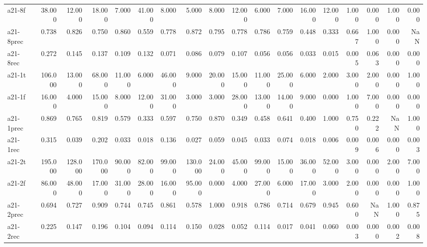 \begin{tabular}{lrrrrrrrrrrrrrrrrr}
a21-8f     &   38.000 &   12.000 &   18.000 &      7.000 &  41.000 &    8.000 &       5.000 &    8.000 &          12.000 &       6.000 &    7.000 &      16.000 &      12.000 &    1.000 &   0.000 &   1.000 &   0.000 \\
a21-8prec  &    0.738 &    0.826 &    0.750 &      0.860 &   0.559 &    0.778 &       0.872 &    0.795 &           0.778 &       0.786 &    0.759 &       0.448 &       0.333 &    0.667 &   1.000 &   0.000 &     NaN \\
a21-8rec   &    0.272 &    0.145 &    0.137 &      0.109 &   0.132 &    0.071 &       0.086 &    0.079 &           0.107 &       0.056 &    0.056 &       0.033 &       0.015 &    0.005 &   0.063 &   0.000 &   0.000 \\
a21-1t     &  106.000 &   13.000 &   68.000 &     11.000 &   6.000 &   46.000 &       9.000 &   20.000 &          15.000 &      11.000 &   25.000 &       6.000 &       2.000 &    3.000 &   2.000 &   0.000 &   1.000 \\
a21-1f     &   16.000 &    4.000 &   15.000 &      8.000 &  12.000 &   31.000 &       3.000 &    3.000 &          28.000 &      13.000 &   14.000 &       9.000 &       0.000 &    1.000 &   7.000 &   0.000 &   0.000 \\
a21-1prec  &    0.869 &    0.765 &    0.819 &      0.579 &   0.333 &    0.597 &       0.750 &    0.870 &           0.349 &       0.458 &    0.641 &       0.400 &       1.000 &    0.750 &   0.222 &     NaN &   1.000 \\
a21-1rec   &    0.315 &    0.039 &    0.202 &      0.033 &   0.018 &    0.136 &       0.027 &    0.059 &           0.045 &       0.033 &    0.074 &       0.018 &       0.006 &    0.009 &   0.006 &   0.000 &   0.003 \\
a21-2t     &  195.000 &  128.000 &  170.000 &     90.000 &  82.000 &   99.000 &     130.000 &   24.000 &          45.000 &      99.000 &   15.000 &      36.000 &      52.000 &    3.000 &   0.000 &   2.000 &   7.000 \\
a21-2f     &   86.000 &   48.000 &   17.000 &     31.000 &  28.000 &   16.000 &      95.000 &    0.000 &           4.000 &      27.000 &    6.000 &      17.000 &       3.000 &    2.000 &   0.000 &   0.000 &   1.000 \\
a21-2prec  &    0.694 &    0.727 &    0.909 &      0.744 &   0.745 &    0.861 &       0.578 &    1.000 &           0.918 &       0.786 &    0.714 &       0.679 &       0.945 &    0.600 &     NaN &   1.000 &   0.875 \\
a21-2rec   &    0.225 &    0.147 &    0.196 &      0.104 &   0.094 &    0.114 &       0.150 &    0.028 &           0.052 &       0.114 &    0.017 &       0.041 &       0.060 &    0.003 &   0.000 &   0.002 &   0.008 \\

\end{tabular}
